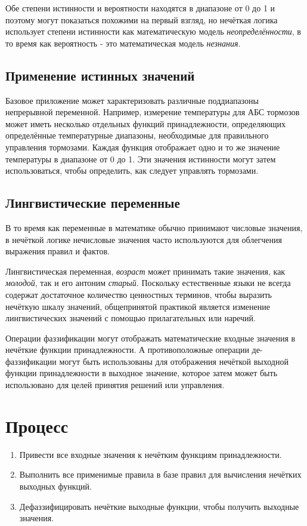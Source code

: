 \documentclass[a4paper,12pt]{report}
\begin{document}
Обе степени истинности и вероятности находятся в диапазоне от 0 до 1 и поэтому могут показаться похожими на первый взгляд, но нечёткая логика использует степени истинности как математическую модель \textit{неопределённости}, в то время как вероятность - это математическая модель \textit{незнания}.

\subsection{Применение истинных значений}
Базовое приложение может характеризовать различные поддиапазоны непрерывной переменной. Например, измерение температуры для АБС тормозов может иметь несколько отдельных функций принадлежности, определяющих определённые температурные диапазоны, необходимые для правильного управления тормозами. Каждая функция отображает одно и то же значение температуры в диапазоне от 0 до 1. Эти значения истинности могут затем использоваться, чтобы определить, как следует управлять тормозами.

\subsection{Лингвистические переменные}
В то время как переменные в математике обычно принимают числовые значения, в нечёткой логике нечисловые значения часто используются для облегчения выражения правил и фактов.

Лингвистическая переменная, \textit{возраст} может принимать такие значения, как \textit{молодой}, так и его антоним \textit{старый}. Поскольку естественные языки не всегда содержат достаточное количество ценностных терминов, чтобы выразить нечёткую шкалу значений, общепринятой практикой является изменение лингвистических значений с помощью прилагательных или наречий.

Операции фаззификации могут отображать математические входные значения в нечёткие функции принадлежности. А противоположные операции де-фаззификации могут быть использованы для отображения нечёткой выходной функции принадлежности в  выходное значение, которое затем может быть использовано для целей принятия решений или управления.

\section{Процесс}
\begin{enumerate}
	\item Привести все входные значения к нечётким функциям принадлежности.
	\item Выполнить все применимые правила в базе правил для вычисления нечётких выходных функций. 
	\item Дефаззифицировать нечёткие выходные функции, чтобы получить  выходные значения.
\end{enumerate}
\end{document}
